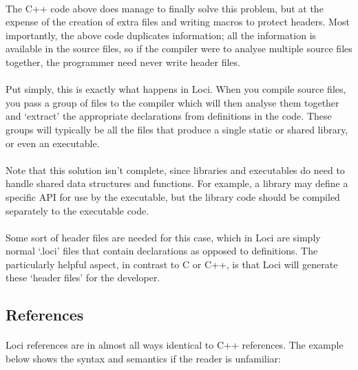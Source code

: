 \documentclass[12pt,twoside,notitlepage]{report}
\begin{document}
\paragraph{}
The C++ code above does manage to finally solve this problem, but at the expense of the creation of extra files and writing macros to protect headers. Most importantly, the above code duplicates information; all the information is available in the source files, so if the compiler were to analyse multiple source files together, the programmer need never write header files.

\paragraph{}
Put simply, this is exactly what happens in Loci. When you compile source files, you pass a group of files to the compiler which will then analyse them together and `extract' the appropriate declarations from definitions in the code. These groups will typically be all the files that produce a single static or shared library, or even an executable.

\paragraph{}
Note that this solution isn't complete, since libraries and executables do need to handle shared data structures and functions. For example, a library may define a specific API for use by the executable, but the library code should be compiled separately to the executable code.

\paragraph{}
Some sort of header files are needed for this case, which in Loci are simply normal `.loci' files that contain declarations as opposed to definitions. The particularly helpful aspect, in contrast to C or C++, is that Loci will generate these `header files' for the developer.

\clearpage

\subsection{References}

\paragraph{}
Loci references are in almost all ways identical to C++ references. The example below shows the syntax and semantics if the reader is unfamiliar:
\end{document}
